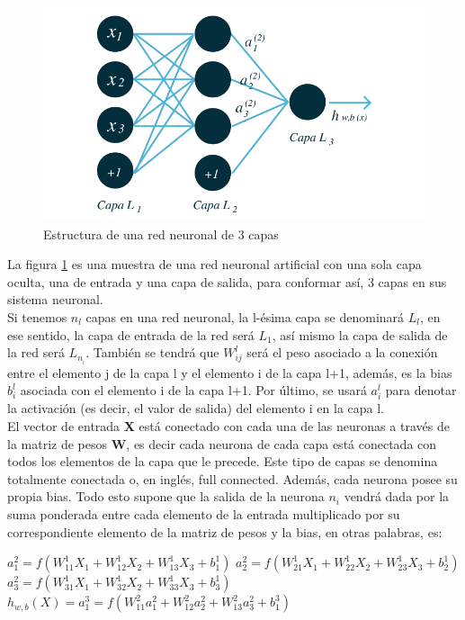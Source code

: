 \begin{figure}[H]
\centering
\includegraphics[width=0.7\linewidth]{imagenes/3_capas.png}
\caption{Estructura de una red neuronal de 3 capas}
\label{fig:3_CAPAS}
\end{figure}

La figura \ref{fig:3_CAPAS} es una muestra de una red neuronal artificial con una sola capa oculta, una de entrada y una capa de salida, para conformar así, 3 capas en sus sistema neuronal.\\
Si tenemos $n_{l}$ capas en una red neuronal, la l-ésima capa se denominará $L_{l}$, en ese sentido, la capa de entrada de la red será $L_{1}$, así mismo la capa de salida de la red será $L_{n}__{l}$. También se tendrá que $W_{ij}^{l}$ será el peso asociado a la conexión entre el elemento j de la capa l y el elemento i de la capa l+1, además, es la bias $b_{i}^{l}$ asociada con el elemento i de la capa l+1. Por último, se usará $a_{i}^{l}$ para denotar la activación (es decir, el valor de salida) del elemento i en la capa l. \\
El vector de entrada \textbf{X} está conectado con cada una de las
neuronas a través de la matriz de pesos \textbf{W}, es decir cada neurona de cada capa está conectada con todos los elementos de la capa que le precede. Este tipo de capas se denomina totalmente conectada o, en inglés, full connected. Además, cada neurona posee su propia bias. Todo esto supone que la salida de la neurona $n_{i}$ vendrá dada por la suma ponderada entre cada elemento de la entrada multiplicado por su correspondiente elemento de la matriz de pesos y la bias, en otras palabras, es:
\begin{center}
    $a_{1}^{2}= f({W_{11}^{1}X_{1}+W_{12}^{1}X_{2}+W_{13}^{1}X_{3}+b_{1}^{1}})$
    $a_{2}^{2}= f({W_{21}^{1}X_{1}+W_{22}^{1}X_{2}+W_{23}^{1}X_{3}+b_{2}^{1}})$
    $a_{3}^{2}= f({W_{31}^{1}X_{1}+W_{32}^{1}X_{2}+W_{33}^{1}X_{3}+b_{3}^{1}})$
    $h_{w,b}(X)=a_{1}^{3}= f({W_{11}^{2}a_{1}^{2}+W_{12}^{2}a_{2}^{2}+W_{13}^{2}a_{3}^{2}+b_{1}^{3}})$
\end{center}
    
